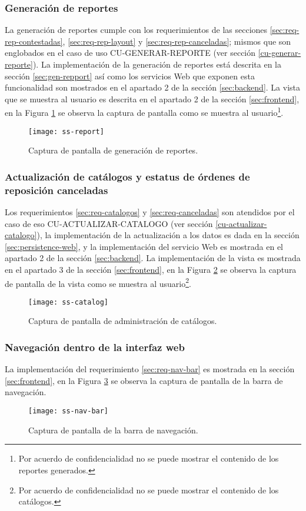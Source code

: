 \subsubsection{Generación de reportes}
La generación de reportes cumple con los requerimientos de las secciones \ref{sec:req-rep-contestadas}, \ref{sec:req-rep-layout} y \ref{sec:req-rep-canceladas}; mismos que son englobados en el caso de uso CU-GENERAR-REPORTE (ver sección \ref{cu-generar-reporte}). La implementación de la generación de reportes está descrita en la sección \ref{sec:gen-repport} así como los servicios Web que exponen esta funcionalidad son mostrados en el apartado 2 de la sección \ref{sec:backend}. La vista que se muestra al usuario es descrita en el apartado 2 de la sección \ref{sec:frontend}, en la Figura \ref{fig:ss-report} se observa la captura de pantalla como se muestra al usuario\footnote{Por acuerdo de confidencialidad no se puede mostrar el contenido de los reportes generados.}. 
	\begin{figure}[h]
		\centering
		\texttt{[image: ss-report]}
		\caption{Captura de pantalla de generación de reportes.}
		\label{fig:ss-report}
	\end{figure}

\subsubsection{Actualización de catálogos y estatus de órdenes de reposición canceladas}
Los requerimientos \ref{sec:req-catalogos} y \ref{sec:req-canceladas} son atendidos por el caso de eso CU-ACTUALIZAR-CATALOGO (ver sección \ref{cu-actualizar-catalogo}), la implementación de la actualización a los datos es dada en la sección \ref{sec:persistence-web}, y la implementación del servicio Web es mostrada en el apartado 2 de la sección \ref{sec:backend}. La implementación de la vista es mostrada en el apartado 3 de la sección \ref{sec:frontend}, en la Figura \ref{fig:ss-catalog} se observa la captura de pantalla de la vista como se muestra al usuario\footnote{Por acuerdo de confidencialidad no se puede mostrar el contenido de los catálogos.}.
\begin{figure}[h]
	\centering
	\texttt{[image: ss-catalog]}
	\caption{Captura de pantalla de administración de catálogos.}
	\label{fig:ss-catalog}
\end{figure}

\subsubsection{Navegación dentro de la interfaz web}
La implementación del requerimiento \ref{sec:req-nav-bar} es mostrada en la sección \ref{sec:frontend}, en la Figura \ref{fig:ss-nav-bar} se observa la captura de pantalla de la barra de navegación.
\begin{figure}[h]
	\centering
	\texttt{[image: ss-nav-bar]}
	\caption{Captura de pantalla de la barra de navegación.}
	\label{fig:ss-nav-bar}
\end{figure}


